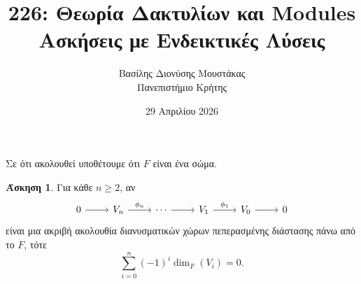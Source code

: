 \documentclass[12pt,a4paper,reqno]{amsart}
\title{226: Θεωρία Δακτυλίων και Modules \\ Ασκήσεις με Ενδεικτικές Λύσεις}
\author[Β.~Δ. Μουστακας]{Βασίλης Διονύσης Μουστάκας \\ Πανεπιστήμιο Κρήτης}
\date{29 Απριλίου 2026}
\theoremstyle{definition}
\newtheorem{exercise}{Άσκηση}
\begin{document}
\begingroup
\def\uppercasenonmath#1{} %
\let\MakeUppercase\relax %
\maketitle
\endgroup

\setcounter{exercise}{31}
\setcounter{equation}{9}
\renewcommand{\thesubsection}{\thesection.\arabic{subsection}}

Σε ότι ακολουθεί υποθέτουμε ότι $F$ είναι ένα σώμα.

\begin{exercise}
  \label{ex:ses_vectorSpaces}
  Για κάθε $n \ge 2$, αν 
  \begin{equation} 
    \label{eq:vectorSpaces_ses}
    \begin{tikzcd}
      0 \arrow[r] & V_n \arrow[r, "\phi_n"] & \cdots \arrow[r] & V_1 \arrow[r, "\phi_1"] & V_0 \arrow[r] & 0
    \end{tikzcd}
  \end{equation}
  είναι μια ακριβή ακολουθία διανυσματικών χώρων πεπερασμένης διάστασης πάνω από το $F$, τότε 
  \[
  \sum_{i=0}^n (-1)^i\dim_F(V_i) = 0.
  \]
\end{exercise}
\end{document}
